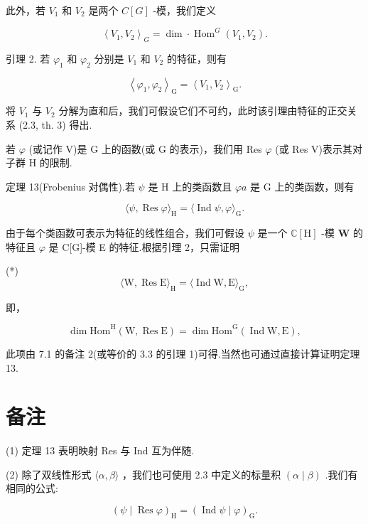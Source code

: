 \documentclass[10pt]{article}
\begin{document}
此外，若 \({V}_{1}\) 和 \({V}_{2}\) 是两个 \(C\left\lbrack  G\right\rbrack\) -模，我们定义

\[
{\left\langle  {V}_{1},{V}_{2}\right\rangle  }_{G} = \dim  \cdot  {\operatorname{Hom}}^{G}\left( {{V}_{1},{V}_{2}}\right) .
\]

引理 2. 若 \({\varphi }_{1}\) 和 \({\varphi }_{2}\) 分别是 \({V}_{1}\) 和 \({V}_{2}\) 的特征，则有

\[
{\left\langle  {\varphi }_{1},{\varphi }_{2}\right\rangle  }_{\mathrm{G}} = {\left\langle  {V}_{1},{V}_{2}\right\rangle  }_{\mathrm{G}}.
\]

将 \({V}_{1}\) 与 \({V}_{2}\) 分解为直和后，我们可假设它们不可约，此时该引理由特征的正交关系 (2.3, th. 3) 得出.

若 \(\varphi\) (或记作 V)是 G 上的函数(或 G 的表示)，我们用 Res \(\varphi\) (或 Res V)表示其对子群 H 的限制.

定理 13(Frobenius 对偶性).若 \(\psi\) 是 \(\mathrm{H}\) 上的类函数且 \({\varphi a}\) 是 \(\mathrm{G}\) 上的类函数，则有

\[
\langle \psi ,\operatorname{Res}\varphi {\rangle }_{\mathrm{H}} = \langle \operatorname{Ind}\psi ,\varphi {\rangle }_{\mathrm{G}}.
\]

由于每个类函数可表示为特征的线性组合，我们可假设 \(\psi\) 是一个 \(\mathbb{C}\left\lbrack  \mathrm{H}\right\rbrack\) -模 \(\mathbf{W}\) 的特征且 \(\varphi\) 是 C[G]-模 E 的特征.根据引理 2，只需证明

(*)
\[
\langle \mathrm{W},\operatorname{Res}\mathrm{E}{\rangle }_{\mathrm{H}} = \langle \operatorname{Ind}\mathrm{W},\mathrm{E}{\rangle }_{\mathrm{G}},
\]

即，

\[
\dim {\mathrm{{Hom}}}^{\mathrm{H}}\left( {\mathrm{W},\operatorname{Res}\mathrm{E}}\right)  = \dim {\mathrm{{Hom}}}^{\mathrm{G}}\left( {\operatorname{Ind}\mathrm{W},\mathrm{E}}\right) ,
\]

此项由 7.1 的备注 2(或等价的 3.3 的引理 1)可得.当然也可通过直接计算证明定理 13.

\section*{备注}

(1) 定理 13 表明映射 Res 与 Ind 互为伴随.

(2) 除了双线性形式 \(\langle \alpha ,\beta \rangle\) ，我们也可使用 2.3 中定义的标量积 \(\left( {\alpha  \mid  \beta }\right)\) .我们有相同的公式:

\[
{\left( \psi  \mid  \operatorname{Res}\varphi \right) }_{\mathrm{H}} = {\left( \operatorname{Ind}\psi  \mid  \varphi \right) }_{\mathrm{G}}.
\]
\end{document}
